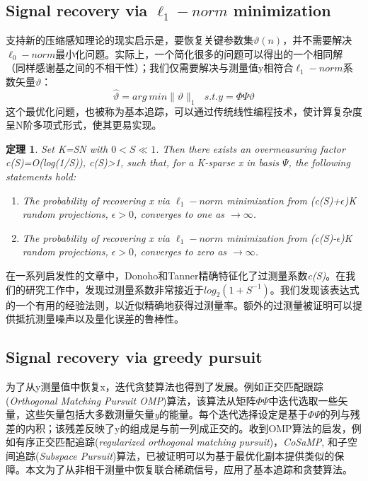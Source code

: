 \documentclass[UTF8]{ctexart}
\theoremstyle{plain}
\newtheorem{theorem}{定理}[section]
\theoremstyle{definition}
\theoremstyle{remark}
\newcommand{\upcite}[1]{\textsuperscript{\textsuperscript{\cite{#1}}}}
\begin{document}
\subsection{Signal recovery via $\ell_1-norm$ minimization}
支持新的压缩感知理论的现实启示是，要恢复关键参数集${\vartheta(n)}$，并不需要解决$\ell_0-norm$最小化问题。实际上，一个简化很多的问题可以得出的一个相同解（同样感谢基之间的不相干性）；我们仅需要解决与测量值y相符合$\ell_1-norm$系数矢量$\vartheta$\upcite{13,14}：
\begin{equation}
	\hat{\vartheta}=arg\ min\lVert \vartheta \rVert_1 \ \ \ s.t.y=\Phi\Psi\vartheta
	\label{eq3}
\end{equation}
这个最优化问题，也被称为\textcolor[rgb]{1,0,0}{基本追踪}，可以通过传统线性编程技术，使计算复杂度呈N阶多项式形式，使其更易实现。

\begin{theorem}
	\label{th2}
	\upcite{9,10,11}Set K=SN with $0<S\ll1$. Then there exists an overmeasuring factor c(S)=O(log(1/S)), c(S)>1, such that, for a K-sparse x in basis $\Psi$, the following statements hold:
	\begin{enumerate}
		\item The probability of recovering x via $\ell_1-norm$ minimization from (c(S)+$\epsilon$)K random projections, $\epsilon>0$, converges to one as $\rightarrow\infty$.
		\item The probability of recovering x via $\ell_1-norm$ minimization from (c(S)-$\epsilon$)K random projections, $\epsilon>0$, converges to zero as $\rightarrow\infty$.
	\end{enumerate}
\end{theorem}
在一系列启发性的文章中，Donoho和Tanner\upcite{10,11,12}精确特征化了过测量系数\emph{\textcolor[rgb]{1,0,0}{c(S)}}。在我们的研究工作中，发现过测量系数非常接近于$log_2(1+S^{-1})$。我们发现该表达式的一个有用的经验法则，以近似精确地获得过测量率。额外的过测量被证明可以提供抵抗测量噪声以及量化误差的鲁棒性\upcite{13}。


\subsection{Signal recovery via greedy pursuit}
为了从y测量值中恢复x，迭代贪婪算法也得到了发展。例如正交匹配跟踪(\emph{\textcolor[rgb]{1,0,0}{Orthogonal Matching Pursuit OMP}})算法，该算法从矩阵$\Phi\Psi$中迭代选取一些矢量，这些矢量包括大多数测量矢量\emph{y}的能量。每个迭代选择设定是基于$\Phi\Psi$的列与残差的内积；该残差反映了y的组成是与前一列成正交的。收到OMP算法的启发，例如有序正交匹配追踪(\emph{\textcolor[rgb]{1,0,0}{regularized orthogonal matching pursuit}})\upcite{15}，\emph{\textcolor[rgb]{1,0,0}{CoSaMP}}\upcite{16}, 和子空间追踪(\textcolor[rgb]{1,0,0}{\emph{Subspace Pursuit}}\upcite{17})算法，已被证明可以为基于最优化副本提供类似的保障。本文为了从非相干测量中恢复联合稀疏信号，应用了基本追踪和贪婪算法。
\end{document}
